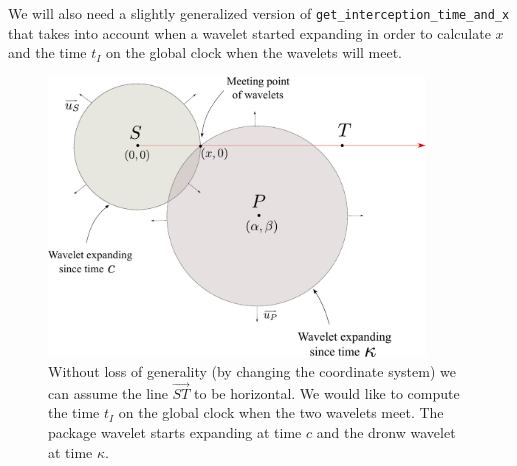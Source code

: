 \documentclass[10pt, english, oneside]{report}
\begin{document}
We will also need a slightly generalized version of \verb|get_interception_time_and_x| that takes into
account when a wavelet started expanding in order to calculate $x$ and the time $t_I$ on the global clock
when the wavelets will meet. 


\begin{figure}[H]
\centering
\includegraphics[width=10cm]{docs/get_interception_time_and_x_generalized.pdf}
\caption{Without loss of generality (by changing the coordinate system) we can assume 
         the line $\vec{ST}$ to be horizontal. We would like to compute the time $t_I$
         on the global clock when the two wavelets meet. The package wavelet starts expanding at 
         time $c$ and the dronw wavelet at time $\kappa$.}
\end{figure}
\end{document}
